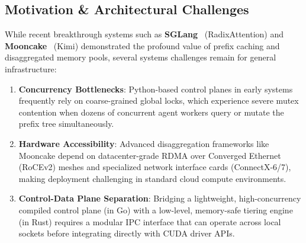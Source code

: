 \documentclass[10pt,twocolumn,letterpaper]{article}
\begin{document}
\subsection{Motivation \& Architectural Challenges}
While recent breakthrough systems such as \textbf{SGLang}~\cite{zheng2023sglang} (RadixAttention) and \textbf{Mooncake}~\cite{mooncake2024} (Kimi) demonstrated the profound value of prefix caching and disaggregated memory pools, several systems challenges remain for general infrastructure:
\begin{enumerate}
    \item \textbf{Concurrency Bottlenecks}: Python-based control planes in early systems frequently rely on coarse-grained global locks, which experience severe mutex contention when dozens of concurrent agent workers query or mutate the prefix tree simultaneously.
    \item \textbf{Hardware Accessibility}: Advanced disaggregation frameworks like Mooncake depend on datacenter-grade RDMA over Converged Ethernet (RoCEv2) meshes and specialized network interface cards (ConnectX-6/7), making deployment challenging in standard cloud compute environments.
    \item \textbf{Control-Data Plane Separation}: Bridging a lightweight, high-concurrency compiled control plane (in Go) with a low-level, memory-safe tiering engine (in Rust) requires a modular IPC interface that can operate across local sockets before integrating directly with CUDA driver APIs.
\end{enumerate}
\end{document}
